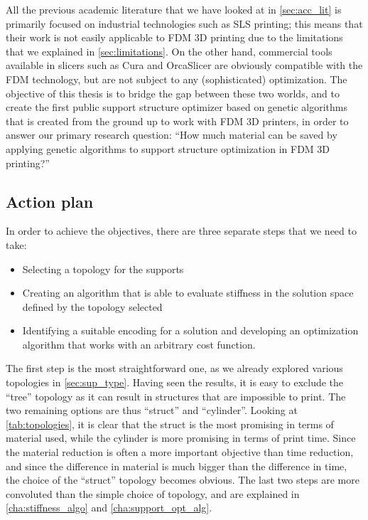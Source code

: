 All the previous academic literature that we have looked at in \cref{sec:acc_lit} is primarily
focused on industrial technologies such as SLS printing; this means that their work is not easily
applicable to FDM 3D printing due to the limitations that we explained in \cref{sec:limitations}.
On the other hand, commercial tools available in slicers such as Cura and OrcaSlicer are obviously compatible
with the FDM technology, but are not subject to any (sophisticated) optimization.
The objective of this thesis is to bridge the gap between these two worlds, and to create the first public
support structure optimizer based on genetic algorithms that is created from the ground up to work with
FDM 3D printers, in order to answer our primary research question:
``How much material can be saved by applying genetic algorithms to support structure optimization in FDM 3D printing?''

\subsection{Action plan}
In order to achieve the objectives, there are three separate steps that we need to take:
\begin{itemize}
    \item Selecting a topology for the supports
    \item Creating an algorithm that is able to evaluate stiffness in the solution space defined by the topology selected
    \item Identifying a suitable encoding for a solution and developing an optimization algorithm that works with an arbitrary cost function.
\end{itemize}
The first step is the most straightforward one, as we already explored various topologies in \cref{sec:sup_type}.
Having seen the results, it is easy to exclude the ``tree'' topology as it can result in structures that are impossible to print.
The two remaining options are thus ``struct'' and ``cylinder''. Looking at \cref{tab:topologies}, it is clear that the struct
is the most promising in terms of material used, while the cylinder is more promising in terms of print time. Since the material reduction
is often a more important objective than time reduction, and since the difference in material is much bigger than the difference
in time, the choice of the ``struct'' topology becomes obvious.
The last two steps are more convoluted than the simple choice of topology, and are explained in \cref{cha:stiffness_algo}
and \cref{cha:support_opt_alg}.